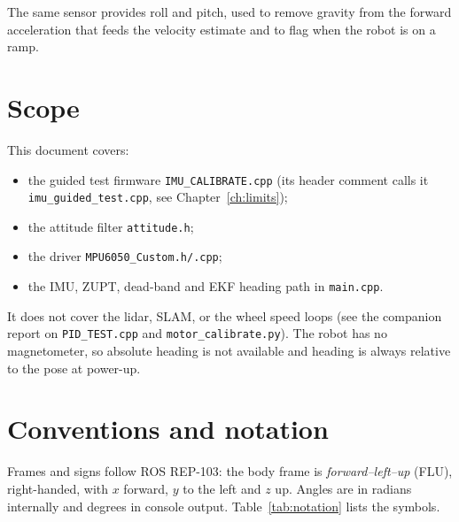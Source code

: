 \documentclass[11pt,a4paper]{report}
\newcommand{\code}[1]{\texttt{#1}}
\begin{document}
The same sensor provides roll and pitch, used to remove gravity from the forward acceleration that feeds the velocity estimate and to flag when the robot is on a ramp.

\section{Scope}
This document covers:
\begin{itemize}[noitemsep]
  \item the guided test firmware \code{IMU\_CALIBRATE.cpp} (its header comment calls it \code{imu\_guided\_test.cpp}, see Chapter~\ref{ch:limits});
  \item the attitude filter \code{attitude.h};
  \item the driver \code{MPU6050\_Custom.h/.cpp};
  \item the IMU, ZUPT, dead-band and EKF heading path in \code{main.cpp}.
\end{itemize}
It does not cover the lidar, SLAM, or the wheel speed loops (see the companion report on \code{PID\_TEST.cpp} and \code{motor\_calibrate.py}). The robot has no magnetometer, so absolute heading is not available and heading is always relative to the pose at power-up.

\section{Conventions and notation}
Frames and signs follow ROS REP-103: the body frame is \emph{forward--left--up} (FLU), right-handed, with $x$ forward, $y$ to the left and $z$ up. Angles are in radians internally and degrees in console output. Table~\ref{tab:notation} lists the symbols.
\end{document}
